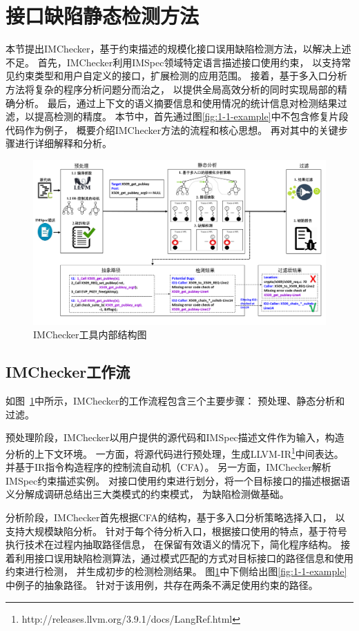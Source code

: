 \section{接口缺陷静态检测方法}
\label{sec:3.3}
本节提出IMChecker，基于约束描述的规模化接口误用缺陷检测方法，以解决上述不足。
首先，IMChecker利用IMSpec领域特定语言描述接口使用约束，
以支持常见约束类型和用户自定义的接口，扩展检测的应用范围。
接着，基于多入口分析方法将复杂的程序分析问题分而治之，
以提供全局高效分析的同时实现局部的精确分析。
最后，通过上下文的语义摘要信息和使用情况的统计信息对检测结果过滤，以提高检测的精度。
本节中，首先通过图\ref{fig:1-1-example}中不包含修复片段代码作为例子，
概要介绍IMChecker方法的流程和核心思想。
再对其中的关键步骤进行详细解释和分析。

\begin{figure}[b]
	\centering
	\includegraphics[width=\linewidth]{figures/cp3-3-overview.png}
	\caption{
		IMChecker工具内部结构图
	}
	\label{fig:3-3-overview}
\end{figure}

\subsection{IMChecker工作流}

如图~\ref{fig:3-3-overview}中所示，IMChecker的工作流程包含三个主要步骤：
预处理、静态分析和过滤。

预处理阶段，IMChecker以用户提供的源代码和IMSpec描述文件作为输入，构造分析的上下文环境。
一方面，将源代码进行预处理，生成LLVM-IR\footnote{http://releases.llvm.org/3.9.1/docs/LangRef.html}中间表达。
并基于IR指令构造程序的控制流自动机（CFA）。
另一方面，IMChecker解析IMSpec约束描述实例。
对接口使用约束进行划分，将一个目标接口的描述根据语义分解成调研总结出三大类模式的约束模式，
为缺陷检测做基础。

分析阶段，IMChecker首先根据CFA的结构，基于多入口分析策略选择入口，
以支持大规模缺陷分析。
针对于每个待分析入口，根据接口使用的特点，基于符号执行技术在过程内抽取路径信息，
在保留有效语义的情况下，简化程序结构。
接着利用接口误用缺陷检测算法，通过模式匹配的方式对目标接口的路径信息和使用约束进行检测，
并生成初步的检测检测结果。
图\ref{fig:3-3-overview}中下侧给出图\ref{fig:1-1-example}中例子的抽象路径。
针对于该用例，共存在两条不满足使用约束的路径。

